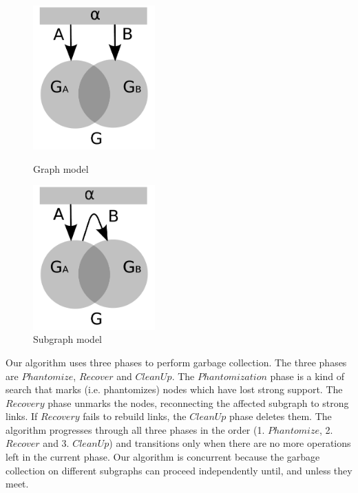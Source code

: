 \begin{figure}[t]
\begin{minipage}[t]{0.5\linewidth}
  \centering
  \includegraphics[height=2.18in]{figs/graphmodel2}
  \caption{Graph model}%
\label{fig:graphmodel2}
\end{minipage}
\begin{minipage}[t]{0.5\linewidth}
  \centering
  \includegraphics[height=2.18in]{figs/graphmodel2b}
  \caption{Subgraph model}%
\label{fig:graphmodel3}
\end{minipage}
\end{figure}

Our algorithm uses three phases to perform garbage collection. The three phases are $Phantomize$, $Recover$ and $CleanUp$. The $Phantomization$ phase is a kind of search that marks (i.e. phantomizes) nodes which have lost strong support. The $Recovery$ phase unmarks the nodes, reconnecting the affected subgraph to strong links. If $Recovery$ fails to rebuild links, the $CleanUp$ phase deletes them. The algorithm progresses through all three phases in the order (1. $Phantomize$, 2. $Recover$ and 3. $CleanUp$) and transitions only when there are no more operations left in the current phase. Our algorithm is concurrent because the garbage collection on different subgraphs can proceed independently until, and unless they meet.

